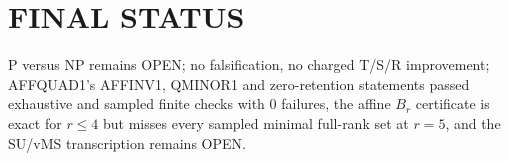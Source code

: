 \documentclass[11pt]{article}
\begin{document}
\section*{FINAL STATUS}
P versus NP remains OPEN; no falsification, no charged T/S/R improvement; AFFQUAD1's AFFINV1, QMINOR1 and zero-retention statements passed exhaustive and sampled finite checks with 0 failures, the affine $B_r$ certificate is exact for $r\le4$ but misses every sampled minimal full-rank set at $r=5$, and the SU/vMS transcription remains OPEN.
\end{document}
